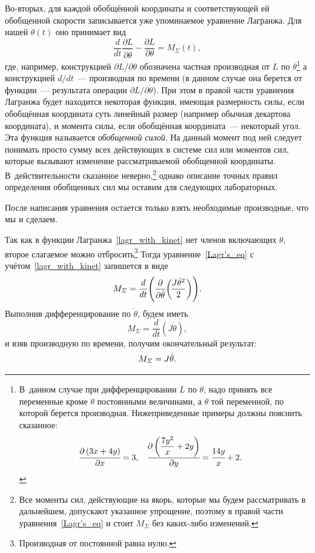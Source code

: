 \documentclass[12pt,a4paper,openany]{extarticle}
\begin{document}
Во-вторых, для каждой обобщённой координаты и соответствующей ей обобщенной скорости записывается уже упоминаемое уравнение Лагранжа.
Для нашей $\theta(t)$ оно принимает вид
\begin{equation}\label{Lagr's_eq}
	\frac{d}{dt}\frac{\partial L}{\partial\dot\theta}-\frac{\partial L}{\partial\theta} = M_\varSigma(t),
\end{equation}
где, например, конструкцией $\partial L/\partial\theta$ обозначена частная производная от $L$ по $\theta$\lefteqn{,}\footnote{В~данном случае при дифференцировании $L$ по $\theta$, надо принять все переменные кроме $\theta$ постоянными величинами, а $\theta$ той переменной, по которой берется производная. Нижеприведенные примеры должны пояснить сказанное:
\begin{align*}
	\cfrac{\partial\left(3x + 4y\right)}{\partial x} &= 3, & 
	\cfrac{\partial\left(\dfrac{7y^2}{x} + 2y\right)}{\partial y} &= \cfrac{14y}{x} + 2\ldotp
\end{align*}} а конструкцией $d/dt$~--- производная по времени (в данном случае она берется от функции~--- результата операции $\partial L/\partial\dot\theta$). 
При этом в правой части уравнения Лагранжа будет находится некоторая функция, имеющая размерность силы, если обобщённая координата суть линейный размер (например обычная декартова координата), и момента силы, если обобщённая координата~--- некоторый угол.
Эта функция называется \textit{обобщенной силой}.
На данный момент под ней следует понимать просто сумму всех действующих в системе сил или моментов сил, которые вызывают изменение рассматриваемой обобщенной координаты.
В~действительности сказанное неверно\lefteqn,\footnote{Все моменты сил, действующие на якорь, которые мы будем рассматривать в дальнейшем, допускают указанное упрощение, поэтому в правой части уравнения~\eqref{Lagr's_eq} и стоит $M_\varSigma$ без каких-либо изменений.} однако описание точных правил определения обобщенных сил мы оставим для следующих лабораторных.

После написания уравнения остается только взять необходимые производные, что мы и сделаем.
 
Так как в функции Лагранжа~\eqref{lagr_with_kinet} нет членов включающих $\theta$, второе слагаемое можно отбросить\footnote{Производная от постоянной равна нулю.} 
Тогда уравнение~\eqref{Lagr's_eq} с учётом~\eqref{lagr_with_kinet} запишется в виде
\begin{equation}\label{Lagr's_eq_without_last}
	M_\varSigma = \frac{d}{dt}\Biggl(\frac{\partial}{\partial\dot\theta}\biggl(\!\frac{J\dot{\theta}^2}{2}\biggr)\Biggr)\ldotp
\end{equation}
Выполнив дифференцирование по $\dot\theta$, будем иметь
\begin{equation} \label{after_first_dif}
	M_\varSigma = \frac{d}{dt}\left(\!J\dot\theta\right)\!,
\end{equation}
и взяв производную по времени, получим окончательный результат:
\begin{equation} \label{after_sec_dif}
	M_\varSigma = J\ddot\theta\ldotp
\end{equation}
\end{document}
